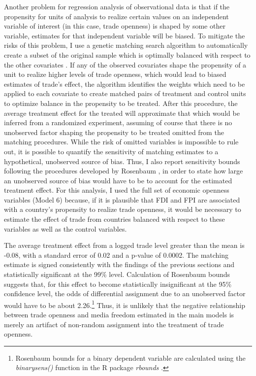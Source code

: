 \documentclass[12pt,a4paper]{article}\usepackage[]{graphicx}\usepackage[]{color}
\begin{document}
Another problem for regression analysis of observational data is that if the propensity for units of analysis to realize certain values on an independent variable of interest (in this case, trade openness) is shaped by some other variable, estimates for that independent variable will be biased. To mitigate the risks of this problem, I use a genetic matching search algorithm to automatically create a subset of the original sample which is optimally balanced with respect to the other covariates \parencites{Diamond:2012jo}{Sekhon:2008wd}. If any of the observed covariates shape the propensity of a unit to realize higher levels of trade openness, which would lead to biased estimates of trade's effect, the algorithm identifies the weights which need to be applied to each covariate to create matched pairs of treatment and control units to optimize balance in the propensity to be treated. After this procedure, the average treatment effect for the treated will approximate that which would be inferred from a randomized experiment, assuming of course that there is no unobserved factor shaping the propensity to be treated omitted from the matching procedures. While the risk of omitted variables is impossible to rule out, it is possible to quantify the sensitivity of matching estimates to a hypothetical, unobserved source of bias. Thus, I also report sensitivity bounds following the procedures developed by Rosenbaum \parencite*{Rosenbaum:1988fl}, in order to state how large an unobserved source of bias would have to be to account for the estimated treatment effect. For this analysis, I used the full set of economic openness variables (Model 6) because, if it is plausible that FDI and FPI are associated with a country's propensity to realize trade openness, it would be necessary to estimate the effect of trade from countries balanced with respect to these variables as well as the control variables.

The average treatment effect from a logged trade level greater than the mean is -0.08, with a standard error of 0.02 and a p-value of 0.0002. The matching estimate is signed consistently with the findings of the previous sections and statistically significant at the 99\% level. Calculation of Rosenbaum bounds suggests that, for this effect to become statistically insignificant at the 95\% confidence level, the odds of differential assignment due to an unobserved factor would have to be about 2.26.\footnote{Rosenbaum bounds for a binary dependent variable are calculated using the \emph{binarysens()} function in the R package \emph{rbounds} \parencite{rboundsPerformRos:2014vj}.} Thus, it is unlikely that the negative relationship between trade openness and media freedom estimated in the main models is merely an artifact of non-random assignment into the treatment of trade openness.
\end{document}
